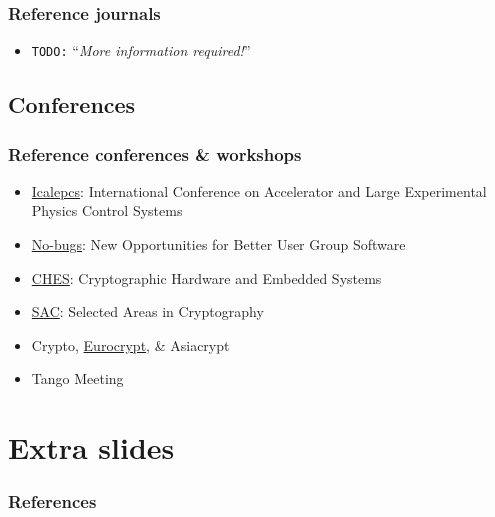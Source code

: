 \documentclass{beamer}
\newcommand{\todo}[1]{\texttt{\color{red}TODO:} ``\emph{#1}''}
\begin{document}
\begin{frame}
\frametitle{Reference journals}
    \begin{itemize}
        \item \todo{More information required!}
    \end{itemize}
\end{frame}

\subsection{Conferences}

\begin{frame}
\frametitle{Reference conferences \& workshops}
\begin{itemize}
    \item \href{http://www.icalepcs.org/}{Icalepcs}: International Conference on Accelerator and Large Experimental Physics Control Systems
    \item \href{http://www.nobugsconference.org/}{No-bugs}: New Opportunities for Better User Group Software
    \item \href{http://www.chesworkshop.org/}{CHES}: Cryptographic Hardware and Embedded Systems
    \item \href{http://www.sacconference.org/}{SAC}: Selected Areas in Cryptography
    \item Crypto, \href{http://www.iacr.org/meetings/eurocrypt/}{Eurocrypt}, \& Asiacrypt
    \item Tango Meeting
\end{itemize}

\end{frame}

\section*{Extra slides}

\begin{frame}[allowframebreaks]
        \frametitle{References}
        
        
\end{frame}
\end{document}
